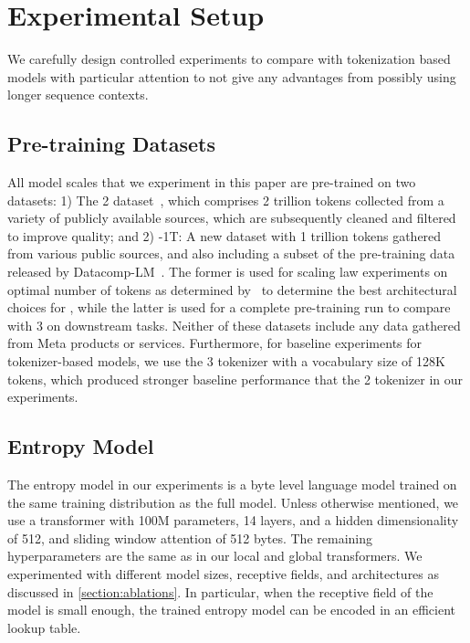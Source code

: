 \documentclass[]{fairmeta}
\begin{document}
\section{Experimental Setup}
\label{section:experiments}
We carefully design controlled experiments to compare \model{} with tokenization based models with particular attention to not give \model{} any advantages from possibly using longer sequence contexts. 


\subsection{Pre-training Datasets}
All model scales that we experiment in this paper are pre-trained on two datasets: 1) The \llama{} 2 dataset~\citep{touvron2023llama}, which comprises 2 trillion tokens collected from a variety of publicly available sources, which are subsequently cleaned and filtered to improve quality; and 2) \model{}-1T: A new dataset with 1 trillion tokens gathered from various public sources, and also including a subset of the pre-training data released by Datacomp-LM~\citep{li2024datacomp}. The former is used for scaling law experiments on optimal number of tokens as determined by~\cite{dubey2024llama} to determine the best architectural choices for \model{}, while the latter is used for a complete pre-training run to compare with \llama{} 3 on downstream tasks. Neither of these datasets include any data gathered from Meta products or services.
Furthermore, for baseline experiments for tokenizer-based models, we use the \llama{} 3 tokenizer with a vocabulary size of 128K tokens, which produced stronger baseline performance that the \llama{} 2 tokenizer in our experiments.



\subsection{Entropy Model}
The entropy model in our experiments is a byte level language model trained on the same training distribution as the full \model{} model. Unless otherwise mentioned, we use a transformer with 100M parameters, 14 layers, and a hidden dimensionality of 512, and sliding window attention of 512 bytes. The remaining hyperparameters are the same as in our local and global transformers. We  experimented with different model sizes, receptive fields, and architectures as discussed in \autoref{section:ablations}. In particular, when the receptive field of the model is small enough, the trained entropy model can be encoded in an efficient lookup table.
\end{document}
